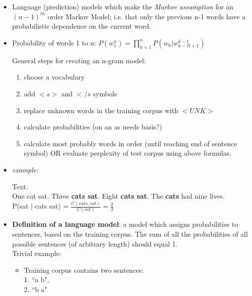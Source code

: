 \documentclass[]{article}
\begin{document}
	\begin{itemize}
	
		\item Language (prediction) models which make the \textit{Markov assumption} for an $(n-1)^{th}$ order Markov Model; i.e. that only the previous n-1 words have a probabilistic dependence on the current word.
		
		\item Probability of words 1 to n: $P(w_1^n) = \prod_{k=1}^{n}P(w_k | w_{k-N+1}^{k-1})$
		
		General steps for creating an n-gram model:		
		\begin{enumerate}
			\item choose a vocabulary 
			\item add $<s>$ and $</s$ symbols 
			\item replace unknown words in the training corpus with $<UNK>$ 
			\item calculate probabilities (on an as needs basis?)
			\item calculate most probably words in order (until reaching end of sentence symbol) OR evaluate perplexity of test corpus using above formulas.
			
		\end{enumerate}
		
		\item \textit{example:} 
		
		\begin{center}
			Text: \\
			One cat sat. Three \textbf{cats sat}. Eight \textbf{cats sat}. The \textbf{cats} had nine lives. 	\\
			
			P(sat $|$ cats sat) = $\frac{C(cats,sat)}{C(cat)} = \frac{2}{3}$
			
		\end{center}
		
		\item \textbf{Definition of a language model}: a model which assigns probabilities to sentences, based on the training corpus. The sum of all the probabilities of all possible sentences (of arbitrary length) should equal 1. \\ 
			
			Trivial example:
			\begin{itemize}
				\item Training corpus contains two sentences: \\ 
				1. ``a b", \\ 
				2. ``b a"
				

\end{itemize}
\end{itemize}
\end{document}
